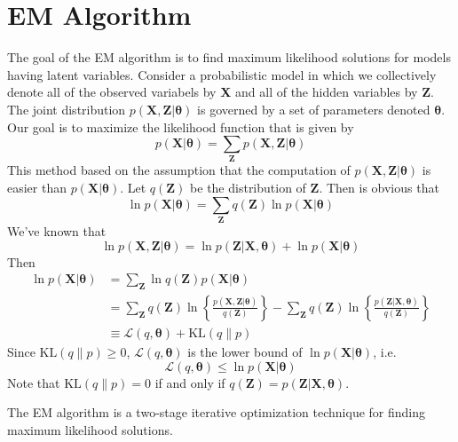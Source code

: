 \documentclass[../main.tex]{subfiles}
\begin{document}
    \section{EM Algorithm}
        The goal of the EM algorithm is to find maximum likelihood solutions for models having latent variables. Consider a probabilistic model in which we collectively denote all of the observed variabels by \textbf{X} and all of the hidden variables by \textbf{Z}. The joint distribution $p(\mathbf{X},\mathbf{Z}|\boldsymbol{\theta})$ is governed by a set of parameters denoted $\boldsymbol{\theta}$. Our goal is to maximize the likelihood function that is given by
        \[
            p(\mathbf{X}|\boldsymbol{\theta})=\sum_{\mathbf{Z}}p(\mathbf{X}, \mathbf{Z}|\boldsymbol{\theta})
        \]
        This method based on the assumption that the computation of $p(\mathbf{X}, \mathbf{Z}|\boldsymbol{\theta})$ is easier than $p(\mathbf{X}|\boldsymbol{\theta})$.
        Let $q(\mathbf{Z})$ be the distribution of $\mathbf{Z}$. Then is obvious that
        \[
            \ln p(\mathbf{X}|\boldsymbol{\theta})=\sum_{\mathbf{Z}}q(\mathbf{Z})\ln p(\mathbf{X}|\boldsymbol{\theta})
        \]
        We've known that
        \[
            \ln p(\mathbf{X},\mathbf{Z}|\boldsymbol{\theta}) = \ln p(\mathbf{Z}|\mathbf{X},\boldsymbol{\theta})+ \ln p(\mathbf{X}|\boldsymbol{\theta})
        \]
        Then
        \begin{align*}
            \ln p(\mathbf{X}|\boldsymbol{\theta})&=\sum_{\mathbf{Z}}\ln q(\mathbf{Z})p(\mathbf{X}|\boldsymbol{\theta})\\
            &=\sum_{\mathbf{Z}}q(\mathbf{Z})\ln\left\{\frac{p(\mathbf{X},\mathbf{Z}|\boldsymbol{\theta})}{q(\mathbf{Z})}\right\}-\sum_{\mathbf{Z}}q(\mathbf{Z})\ln\left\{\frac{p(\mathbf{Z}|\mathbf{X},\boldsymbol{\theta})}{q(\mathbf{Z})}\right\}\\
            &\equiv\mathcal{L}(q,\boldsymbol{\theta})+\mathrm{KL}(q\|p)
        \end{align*}
        Since $\mathrm{KL}(q\|p)\geq0$, $\mathcal{L}(q,\boldsymbol{\theta})$ is the lower bound of $\ln p(\mathbf{X}|\boldsymbol{\theta})$, i.e.
        \[
            \mathcal{L}(q,\boldsymbol{\theta})\leq\ln p(\mathbf{X}|\boldsymbol{\theta})
        \]
        Note that $\mathrm{KL}(q\|p)=0$ if and only if $q(\mathbf{Z})=p(\mathbf{Z}|\mathbf{X},\boldsymbol{\theta})$.
        
        The EM algorithm is a two-stage iterative optimization technique for finding maximum likelihood solutions.
\end{document}
